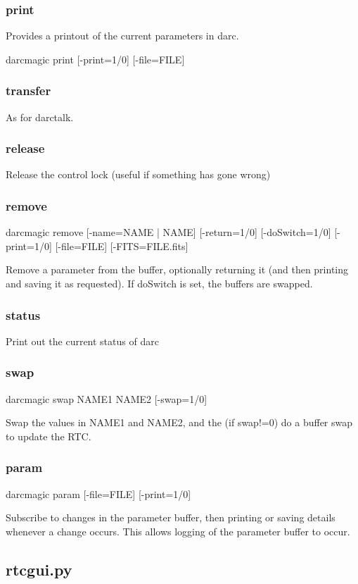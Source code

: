 \documentclass[a4,10pt]{article}
\begin{document}
\subsubsection{print}
Provides a printout of the current parameters in darc.

darcmagic print [-print=1/0] [-file=FILE]



\subsubsection{transfer}
As for darctalk.

\subsubsection{release}
Release the control lock (useful if something has gone wrong)

\subsubsection{remove}
darcmagic remove [-name=NAME | NAME] [-return=1/0] [-doSwitch=1/0]
[-print=1/0] [-file=FILE] [-FITS=FILE.fits]

Remove a parameter from the buffer, optionally returning it (and then
printing and saving it as requested).  If doSwitch is set, the buffers
are swapped.

\subsubsection{status}
Print out the current status of darc
\subsubsection{swap}
darcmagic swap NAME1 NAME2 [-swap=1/0]

Swap the values in NAME1 and NAME2, and the (if swap!=0) do a buffer
swap to update the RTC.

\subsubsection{param}
darcmagic param [-file=FILE] [-print=1/0]

Subscribe to changes in the parameter buffer, then printing or saving
details whenever a change occurs.  This allows logging of the
parameter buffer to occur.

\subsection{rtcgui.py}
\end{document}
